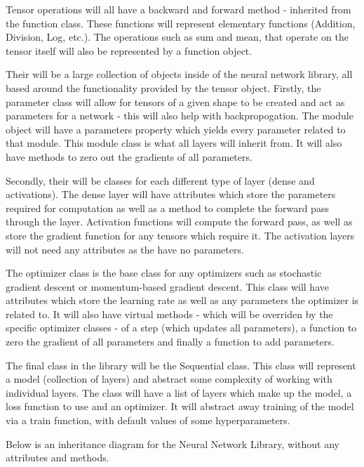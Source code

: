 \documentclass{article}
\makeatletter
\newcommand\subsubsubsection{\@startsection{paragraph}{4}{\z@}{-2.5ex\@plus -1ex \@minus -.25ex}{1.25ex \@plus .25ex}{\normalfont\normalsize\bfseries}}
\makeatother
\begin{document}
    Tensor operations will all have a backward and forward method - inherited from the function class. These functions will represent elementary functions (Addition, Division, Log, etc.). 
    The operations such as sum and mean, that operate on the tensor itself will also be represented by a function object.

    \subsubsubsection{Neural Network Library}
    Their will be a large collection of objects inside of the neural network library, all based around the functionality provided by the tensor object.
    Firstly, the parameter class will allow for tensors of a given shape to be created and act as parameters for a network - this will also help with backpropogation.
    The module object will have a parameters property which yields every parameter related to that module. This module class is what all layers will inherit from. It will also
    have methods to zero out the gradients of all parameters.

    Secondly, their will be classes for each different type of layer (dense and activations). The dense layer will have attributes which store the parameters required
    for computation as well as a method to complete the forward pass through the layer. Activation functions will compute the forward pass, as well as store the gradient function
    for any tensors which require it. The activation layers will not need any attributes as the have no parameters.

    The optimizer class is the base class for any optimizers such as stochastic gradient descent or momentum-based gradient descent. This class will have attributes which store
    the learning rate as well as any parameters the optimizer is related to. It will also have virtual methods - which will be overriden by the specific optimizer classes - of
    a step (which updates all parameters), a function to zero the gradient of all parameters and finally a function to add parameters.

    The final class in the library will be the Sequential class. This class will represent a model (collection of layers) and abstract some complexity of working with individual layers.
    The class will have a list of layers which make up the model, a loss function to use and an optimizer. It will abstract away training of the model via a train function, with default
    values of some hyperparameters.

    Below is an inheritance diagram for the Neural Network Library, without any attributes and methods.
\end{document}
